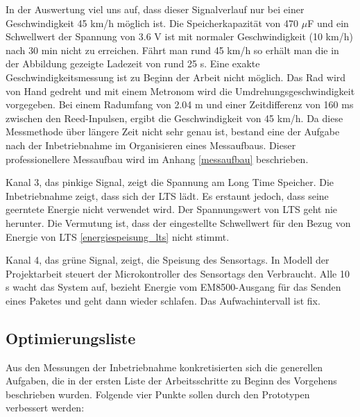 In der Auswertung viel uns auf, dass dieser Signalverlauf nur bei einer Geschwindigkeit 45 km/h möglich ist. Die Speicherkapazität von 470 $\mu$F und ein Schwellwert der Spannung von 3.6 V ist mit normaler Geschwindigkeit (10 km/h) nach 30 min nicht zu erreichen. Fährt man rund 45 km/h so erhält man die in der Abbildung gezeigte Ladezeit von rund 25 s. Eine exakte Geschwindigkeitsmessung ist zu Beginn der Arbeit nicht möglich. Das Rad wird von Hand gedreht und mit einem Metronom wird die Umdrehungsgeschwindigkeit vorgegeben. Bei einem Radumfang von 2.04 m und einer Zeitdifferenz von 160 ms zwischen den Reed-Inpulsen, ergibt die Geschwindigkeit von 45 km/h. Da diese Messmethode über längere Zeit nicht sehr genau ist, bestand eine der Aufgabe nach der Inbetriebnahme im Organisieren eines Messaufbaus. Dieser professionellere Messaufbau wird im Anhang \ref{messaufbau} beschrieben.


Kanal 3, das pinkige Signal, zeigt die Spannung am Long Time Speicher. Die Inbetriebnahme zeigt, dass sich der LTS lädt. Es erstaunt jedoch, dass seine geerntete Energie nicht verwendet wird. Der Spannungswert von LTS geht nie herunter.
Die Vermutung ist, dass der eingestellte Schwellwert für den Bezug von Energie von LTS \ref{energiespeisung_lts} nicht stimmt.

Kanal 4, das grüne Signal, zeigt, die Speisung des Sensortags. In Modell der Projektarbeit steuert der Microkontroller des Sensortags den Verbraucht. Alle 10 s wacht das System auf, bezieht Energie vom EM8500-Ausgang für das Senden eines Paketes und geht dann wieder schlafen. Das Aufwachintervall ist fix.


\subsection{Optimierungsliste}\label{optimierung} 


Aus den Messungen der Inbetriebnahme konkretisierten sich die generellen Aufgaben, die in der ersten Liste der Arbeitsschritte zu Beginn des Vorgehens  beschrieben wurden. Folgende vier Punkte sollen durch den Prototypen verbessert werden: 

